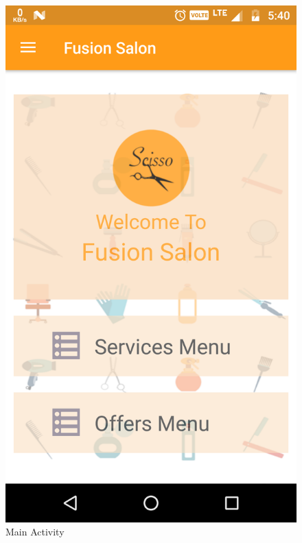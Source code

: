 \begin{figure}[h]
	\centering
	\includegraphics[width=0.7\linewidth]{MainActivity}
	\caption{Main Activity}
\end{figure}
\pagebreak

